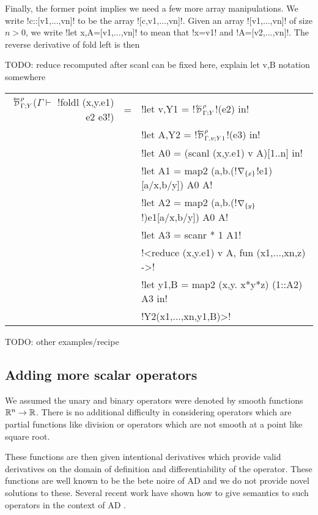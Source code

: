 Finally, the former point implies we need a few more array manipulations. 
We write !c::[v1,...,vn]! to be the array ![c,v1,...,vn]!. 
Given an array ![v1,...,vn]! of size $n>0$, we write !let x,A=[v1,...,vn]! to mean 
that !x=v1! and !A=[v2,...,vn]!. The reverse derivative of fold left is then

TODO: reduce recomputed after scanl can be fixed here, explain let v,B notation somewhere
\begin{center}
\begin{tabular}{r c l}
    $\directD{\rho}{\Gamma}{Y}$($\Gamma\vdash $ !foldl (x,y.e1) e2 e3!) &=&
            !let v,Y1 = !$\directD{\rho}{\Gamma}{Y}$!(e2) in! \\
            && !let A,Y2 = !$\directD{\rho}{\Gamma,v}{Y1}$!(e3) in! \\
            && !let A0 = (scanl (x,y.e1) v A)[1..n] in! \\
            && !let A1 = map2 (a,b.(!$\nabla_{\{x\}}$!e1)[a/x,b/y]) A0 A! \\
            && !let A2 = map2 (a,b.(!$\nabla_{\{y\}}$!)e1[a/x,b/y]) A0 A! \\
            && !let A3 = scanr * 1 A1! \\
            && !<reduce (x,y.e1) v A, fun (x1,...,xn,z) ->! \\
            && !let y1,B = map2 (x,y. x*y*z) (1::A2) A3 in! \\
            && !Y2(x1,...,xn,y1,B)>! \\
\end{tabular}
\end{center}

TODO: other examples/recipe

\subsection{Adding more scalar operators} %
\label{sub:Adding more scalar operators}

We assumed the unary and binary operators were denoted by smooth functions $\mathbb{R}^n\to\mathbb{R}$. 
There is no additional difficulty in considering operators which are partial functions 
like division or operators which are not smooth at a point like square root.

These functions are then given intentional derivatives which provide valid derivatives 
on the domain of definition and differentiability of the operator. 
These functions are well known to be the bete noire of AD \cite{griewank2008evaluating} 
and we do not provide novel solutions to these.  
Several recent work have shown how to give semantics to such operators in the context of AD \cite{vakar2020denotational,mazza2021automatic,sherman2021,lee2020correctness}.

